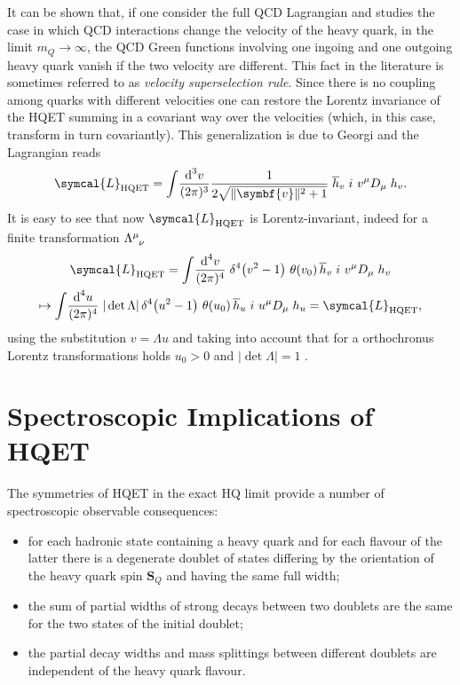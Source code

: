 It can be shown \cite{Mannel:1991mc} that, if one consider the full QCD Lagrangian and studies the case in which QCD interactions change the velocity of the heavy quark, in the limit $m_Q \to \infty$, the QCD Green functions involving one ingoing and one outgoing heavy quark vanish if the two velocity are different. This fact in the literature is sometimes referred to as \emph{velocity superselection rule}. Since there is no coupling among quarks with different velocities one can restore the Lorentz invariance of the HQET summing in a covariant way over the velocities (which, in this case, transform in turn covariantly). This generalization is due to Georgi \cite{Georgi:1990um} and the Lagrangian reads
\begin{equation}
  \symcal{L}_\text{HQET} = \int \! \frac{\D^3 \! v}{(2 \pi)^3} \frac{1}{2 \sqrt{\Vert \symbf{v} \Vert^2 + 1}} \; \adj{h}_v \left. i \ v^\mu D_\mu \right. h_v .
\end{equation}
It is easy to see that now $\symcal{L}_\text{HQET}$ is Lorentz-invariant, indeed for a finite transformation $\Lambda\indices{^\mu_\nu}$
\begin{multline}
  \symcal{L}_\text{HQET} = \int \! \frac{\D^4 \! v}{(2 \pi)^4} \; \delta^4 \! \left( v^2 - 1 \right) \, \theta ( v_0 ) \, \adj{h}_v \left. i \ v^\mu D_\mu \right. h_v \\ \mapsto \int \!  \frac{\D^4 \! u}{(2 \pi)^4} \; \vert \det{\Lambda} \vert \, \delta^4 \! \left( u^2 - 1 \right) \, \theta ( u_0 ) \, \adj{h}_u \left. i \ u^\mu D_\mu \right. h_u = \symcal{L}_\text{HQET} ,
\end{multline}
using the substitution $v = \Lambda u$ and taking into account that for a orthochronus Lorentz transformations holds $u_0 > 0$ and $\vert \det{\Lambda} \vert = 1$ .

\section{Spectroscopic Implications of HQET}
\label{sec:spectroscopic_implications_of_hqet}

The symmetries of HQET in the exact HQ limit provide a number of spectroscopic observable consequences:
\begin{itemize}
  \item for each hadronic state containing a heavy quark and for each flavour of the latter there is a degenerate doublet of states differing by the orientation of the heavy quark spin $\symbf{S}_Q$ and having the same full width;
  \item the sum of partial widths of strong decays between two doublets are the same for the two states of the initial doublet;
  \item the partial decay widths and mass splittings between different doublets are independent of the heavy quark flavour.
\end{itemize}

